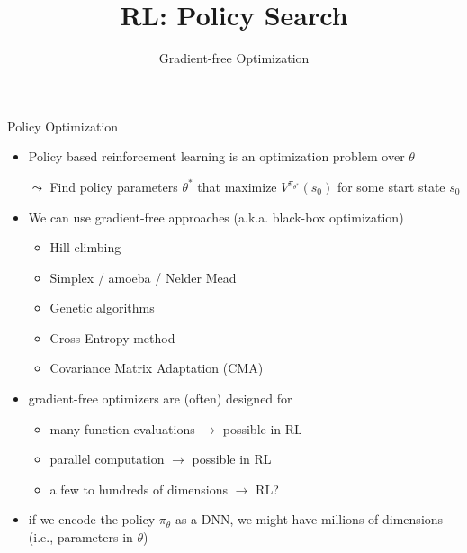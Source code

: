 \documentclass[aspectratio=169]{../latex_main/tntbeamer}  %
\title[RL: Gradient-free]{RL: Policy Search}
\subtitle{Gradient-free Optimization}
\begin{document}
	
	\maketitle

\begin{frame}[c]{Policy Optimization}

\begin{itemize}
	\item Policy based reinforcement learning is an \alert{optimization} problem over $\theta$
	\item[$\leadsto$] Find policy parameters $\theta^*$ that maximize $V^{\pi_{\theta^*}}(s_0)$ for some start state $s_0$
	\item We can use gradient-free approaches (a.k.a. black-box optimization)
	\begin{itemize}
		\item Hill climbing
		\item Simplex / amoeba / Nelder Mead
		\item Genetic algorithms
		\item Cross-Entropy method
		\item Covariance Matrix Adaptation (CMA)
	\end{itemize}
	\pause
	\smallskip
	\item gradient-free optimizers are (often) designed for
	\begin{itemize}
		\item many function evaluations $\to$ possible in RL
		\item parallel computation $\to$ possible in RL
		\item a few to hundreds of dimensions $\to$ RL?
	\end{itemize}
	\pause
	\item if we encode the policy $\pi_\theta$ as a DNN, we might have \alert{millions} of dimensions\\ (i.e., parameters in $\theta$)

\end{itemize}

\end{frame}
\end{document}
